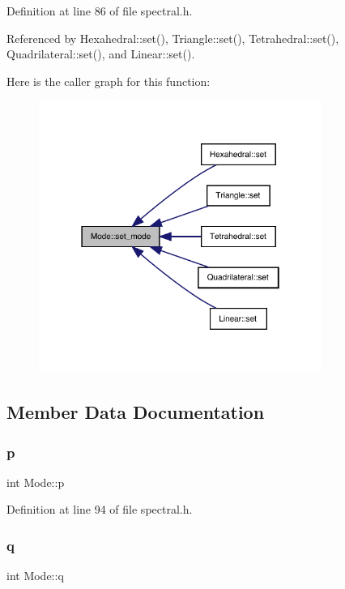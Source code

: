 Definition at line 86 of file spectral.\+h.



Referenced by Hexahedral\+::set(), Triangle\+::set(), Tetrahedral\+::set(), Quadrilateral\+::set(), and Linear\+::set().

Here is the caller graph for this function\+:
\nopagebreak
\begin{figure}[H]
\begin{center}
\leavevmode
\includegraphics[width=262pt]{classMode_a463a9d97e170c258eeb1ea70b7b7a405_icgraph}
\end{center}
\end{figure}


\subsection{Member Data Documentation}
\mbox{\label{classMode_a92567563f5caeb6fc42da31dbabd3346}} 
\subsubsection{\texorpdfstring{p}{p}}
{\footnotesize\ttfamily int Mode\+::p\hspace{0.3cm}{\ttfamily [private]}}



Definition at line 94 of file spectral.\+h.

\mbox{\label{classMode_aa5d3b95f3a4ba70e816da9289e9f51b3}} 
\subsubsection{\texorpdfstring{q}{q}}
{\footnotesize\ttfamily int Mode\+::q\hspace{0.3cm}{\ttfamily [private]}}



